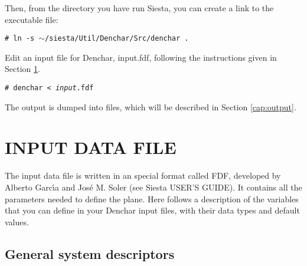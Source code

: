  Then, from the directory you have run {\sc Siesta}, 
 you can create a link to the executable file:

 {\tt \# ln -s $\sim$/siesta/Util/Denchar/Src/denchar . }

 Edit an input file for {\sc Denchar}, input.fdf, following the 
 instructions given in Section \ref{cap:input}.


 {\tt \# denchar < {\it input}.fdf } 


 The output is dumped into files, which will be described
 in Section \ref{cap:output}.

\section{INPUT DATA FILE}
\label{cap:input} 

The input data file is written in an special format called FDF, developed
by Alberto Garc\'{\i}a and Jos\'e M. Soler (see {\sc Siesta} USER'S GUIDE).
It contains all the parameters needed to define the plane.
Here follows a description of the variables that you can define in your 
{\sc Denchar} input files,
with their data types and default values.

\vspace{5pt}
\subsection{General system descriptors}

